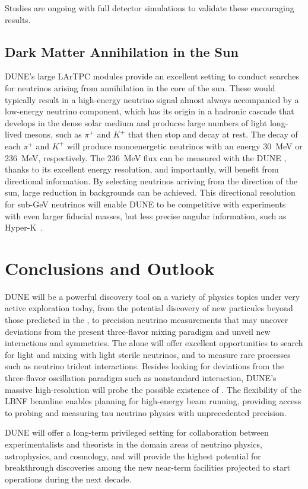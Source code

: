 Studies are ongoing with full detector simulations to validate these 
encouraging results.


\subsection{Dark Matter Annihilation in the Sun}
DUNE's large  LArTPC modules provide an excellent setting to conduct searches for neutrinos arising from  annihilation in the core of the sun. These would typically result in a high-energy neutrino signal almost always accompanied by a low-energy neutrino component, which has its origin in a hadronic cascade that develops in the dense solar medium and produces large numbers of light long-lived mesons, such as $\pi^+$ and $K^+$ that
then stop and decay at rest. The decay of each $\pi^+$ and $K^+$ will produce monoenergetic neutrinos with an energy \SI{30}{MeV} or \SI{236}{MeV}, respectively.
The  \SI{236}{MeV} flux can be measured with the DUNE , thanks to its excellent energy resolution, and importantly, will benefit from directional information. By selecting neutrinos arriving from the direction of the sun, large reduction in backgrounds can be achieved.
This directional resolution for sub-GeV neutrinos will enable DUNE to be competitive with experiments with even larger fiducial masses, but less precise angular information, such as Hyper-K~\cite{ref:DMannihilation}.

\section{Conclusions and Outlook}
DUNE will be a powerful discovery tool on a variety of physics topics under very active exploration today, from the potential discovery of new particules beyond those predicted in the , to precision neutrino measurements that may uncover deviations from the present three-flavor mixing paradigm and unveil new interactions and symmetries.
The  alone will offer excellent opportunities to search for light  and mixing with light sterile neutrinos, and to measure rare processes such as neutrino trident interactions. Besides looking for deviations from the three-flavor oscillation paradigm such as nonstandard interaction, DUNE's massive high-resolution  will probe  the possible existence of . The flexibility of the LBNF beamline enables planning for high-energy beam running, providing access to probing and measuring tau neutrino physics with unprecedented precision.

DUNE will offer a long-term privileged setting for collaboration between experimentalists and theorists in the domain areas of neutrino physics, astrophysics, and cosmology, and will provide the highest potential for breakthrough discoveries among the new near-term facilities projected to start operations during the next decade.
